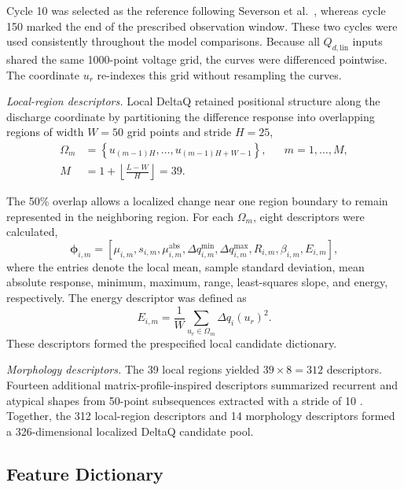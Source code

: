 \documentclass[pdflatex,sn-mathphys-num]{sn-jnl}
\begin{document}
Cycle 10 was selected as the reference following Severson et al.~\cite{severson2019data}, whereas cycle 150 marked the end of the prescribed observation window. These two cycles were used consistently throughout the model comparisons. Because all $Q_{d,\mathrm{lin}}$ inputs shared the same 1000-point voltage grid, the curves were differenced pointwise. The coordinate $u_r$ re-indexes this grid without resampling the curves.

\noindent\textit{Local-region descriptors.}
Local DeltaQ retained positional structure along the discharge coordinate by partitioning the difference response into overlapping regions of width $W=50$ grid points and stride $H=25$,
\begin{equation}
\begin{aligned}
\Omega_m
&=
\left\{
u_{(m-1)H},
\ldots,
u_{(m-1)H+W-1}
\right\},
&&
m=1,\ldots,M,\\
M
&=
1+\left\lfloor\frac{L-W}{H}\right\rfloor
=
39.
\end{aligned}
\end{equation}

The 50\% overlap allows a localized change near one region boundary to remain represented in the neighboring region. For each $\Omega_m$, eight descriptors were calculated,
\begin{equation}
\boldsymbol{\phi}_{i,m}
=
\left[
\mu_{i,m},
s_{i,m},
\mu^{\mathrm{abs}}_{i,m},
\Delta q^{\min}_{i,m},
\Delta q^{\max}_{i,m},
R_{i,m},
\beta_{i,m},
E_{i,m}
\right],
\end{equation}
where the entries denote the local mean, sample standard deviation, mean absolute response, minimum, maximum, range, least-squares slope, and energy, respectively. The energy descriptor was defined as
\begin{equation}
E_{i,m}
=
\frac{1}{W}
\sum_{u_r\in\Omega_m}
\Delta q_i(u_r)^2.
\end{equation}
These descriptors formed the prespecified local candidate dictionary.

\noindent\textit{Morphology descriptors.}
The 39 local regions yielded $39\times8=312$ descriptors. Fourteen additional matrix-profile-inspired descriptors summarized recurrent and atypical shapes from 50-point subsequences extracted with a stride of 10 \cite{yeh2016matrix}. Together, the 312 local-region descriptors and 14 morphology descriptors formed a 326-dimensional localized DeltaQ candidate pool.

\endgroup


\subsection{Feature Dictionary}
\label{subsec:feature_assembly}
\end{document}
